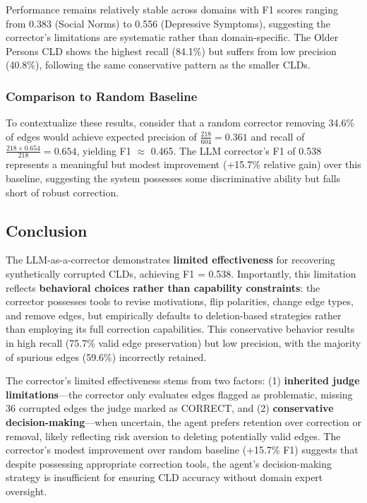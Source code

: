 Performance remains relatively stable across domains with F1 scores ranging from 0.383 (Social Norms) to 0.556 (Depressive Symptoms), suggesting the corrector's limitations are systematic rather than domain-specific. The Older Persons CLD shows the highest recall (84.1\%) but suffers from low precision (40.8\%), following the same conservative pattern as the smaller CLDs.

\subsubsection{Comparison to Random Baseline}

To contextualize these results, consider that a random corrector removing 34.6\% of edges would achieve expected precision of $\frac{218}{604} = 0.361$ and recall of $\frac{218 \times 0.654}{218} = 0.654$, yielding F1 $\approx$ 0.465. The LLM corrector's F1 of 0.538 represents a meaningful but modest improvement (+15.7\% relative gain) over this baseline, suggesting the system possesses some discriminative ability but falls short of robust correction.

\subsection{Conclusion}

The LLM-as-a-corrector demonstrates \textbf{limited effectiveness} for recovering synthetically corrupted CLDs, achieving F1 = 0.538. Importantly, this limitation reflects \textbf{behavioral choices rather than capability constraints}: the corrector possesses tools to revise motivations, flip polarities, change edge types, and remove edges, but empirically defaults to deletion-based strategies rather than employing its full correction capabilities. This conservative behavior results in high recall (75.7\% valid edge preservation) but low precision, with the majority of spurious edges (59.6\%) incorrectly retained.

The corrector's limited effectiveness stems from two factors: (1) \textbf{inherited judge limitations}---the corrector only evaluates edges flagged as problematic, missing 36 corrupted edges the judge marked as CORRECT, and (2) \textbf{conservative decision-making}---when uncertain, the agent prefers retention over correction or removal, likely reflecting risk aversion to deleting potentially valid edges. The corrector's modest improvement over random baseline (+15.7\% F1) suggests that despite possessing appropriate correction tools, the agent's decision-making strategy is insufficient for ensuring CLD accuracy without domain expert oversight.
